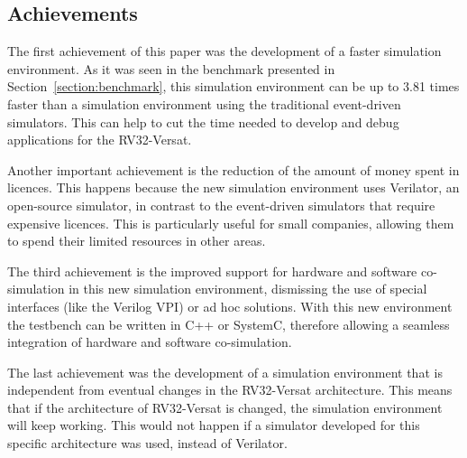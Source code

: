 \documentclass[conference]{IEEEtran}
\begin{document}
\subsection{Achievements}
\label{section:achievements}


The first achievement of this paper was the development of a faster simulation 
environment. As it was seen in the benchmark presented in 
Section~\ref{section:benchmark}, this simulation environment can be up to 3.81 times 
faster than a simulation environment using the traditional event-driven simulators. This 
can help to cut the time needed to develop and debug applications for the RV32-Versat.

Another important achievement is the reduction of the amount of money spent in licences. 
This happens because the new simulation environment uses Verilator, an open-source 
simulator, in contrast to the event-driven simulators that require expensive licences. 
This is particularly useful for small companies, allowing them to spend their limited 
resources in other areas.

The third achievement is the improved support for hardware and software 
co-simulation in this new simulation environment, dismissing the use of special 
interfaces (like the Verilog \ac{VPI}) or ad hoc solutions. With this new environment the 
testbench can be written in C++ or SystemC, therefore allowing a seamless integration of 
hardware and software co-simulation.

The last achievement was the development of a simulation environment that is independent 
from eventual changes in the RV32-Versat architecture. This means that if the 
architecture of RV32-Versat is changed, the simulation environment will keep working. 
This would not happen if a simulator developed for this specific architecture was used, 
instead of Verilator.





\end{document}
